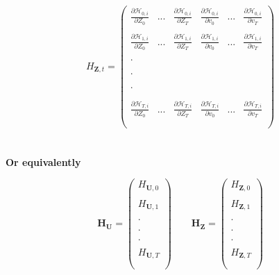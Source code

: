 \documentclass[titlepage]{\econtex}\providecommand{\texname}{FBS-NK}
\begin{document}
  $$ H_{\mathbf{Z}, t}= \begin{pmatrix} 
\frac{ \partial \mathcal{H}_{0,i}}{\partial Z_{0}}  & ... & \frac{ \partial \mathcal{H}_{0,i}}{\partial Z_{T}} & \frac{ \partial \mathcal{H}_{0,i}}{\partial v_{0}} & ... & \frac{ \partial \mathcal{H}_{0,i}}{\partial v_{T}} \\ \\ 
\frac{ \partial \mathcal{H}_{1,i}}{\partial Z_{0}}  & ... & \frac{ \partial \mathcal{H}_{1,i}}{\partial Z_{T}} & \frac{ \partial \mathcal{H}_{1,i}}{\partial v_{0}} & ... & \frac{ \partial \mathcal{H}_{1,i}}{\partial v_{T}} \\ \\
. \\ \\ \\ 
. \\ \\ \\
. \\ \\ \\
\frac{ \partial \mathcal{H}_{T,i}}{\partial Z_{0}}  & ... & \frac{ \partial \mathcal{H}_{T,i}}{\partial Z_{T}} & \frac{ \partial \mathcal{H}_{T,i}}{\partial v_{0}} & ... & \frac{ \partial \mathcal{H}_{T,i}}{\partial v_{T}}  \\ \\
 \end{pmatrix} $$ \\ \\
 
 
\textbf{ Or equivalently}

 $$  \mathbf{H}_{\mathbf{U}}= \begin{pmatrix} 
H_{\mathbf{U}, 0} \\ \\ 
H_{\mathbf{U}, 1}  \\ \\
. \\ \\
. \\ \\
. \\ \\ 
H_{\mathbf{U}, T} \\ \\
 \end{pmatrix} \quad \quad \mathbf{H}_{\mathbf{Z}}= \begin{pmatrix} 
H_{\mathbf{Z}, 0} \\ \\ 
H_{\mathbf{Z}, 1}  \\ \\
. \\ \\
. \\ \\
. \\ \\ 
H_{\mathbf{Z}, T} \\ \\
 \end{pmatrix}$$ \\ \\
 
\end{document}
